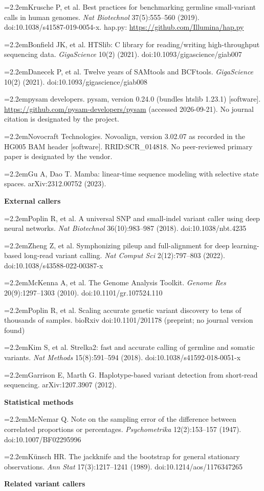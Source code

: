 \documentclass[11pt,a4paper]{article}
\newcommand{\refitem}[2]{\par\noindent\hangindent=2.2em\hangafter=1\makebox[2.2em][l]{[#1]}#2\par\vspace{2pt}}
\begin{document}
\refitem{11}{Krusche P, et al. Best practices for benchmarking germline small-variant calls in human genomes. \emph{Nat Biotechnol} 37(5):555--560 (2019). doi:10.\allowbreak{}1038/\allowbreak{}s41587-019-0054-x.\allowbreak{} hap.py: \url{https://github.com/Illumina/hap.py}}
\refitem{12}{Bonfield JK, et al. HTSlib: C library for reading/writing high-throughput sequencing data. \emph{GigaScience} 10(2) (2021). doi:10.\allowbreak{}1093/\allowbreak{}gigascience/\allowbreak{}giab007}
\refitem{13}{Danecek P, et al. Twelve years of SAMtools and BCFtools. \emph{GigaScience} 10(2) (2021). doi:10.\allowbreak{}1093/\allowbreak{}gigascience/\allowbreak{}giab008}
\refitem{14}{pysam developers. pysam, version 0.24.0 (bundles htslib 1.23.1) [software]. \url{https://github.com/pysam-developers/pysam} (accessed 2026-09-21). No journal citation is designated by the project.}
\refitem{15}{Novocraft Technologies. Novoalign, version 3.02.07 as recorded in the HG005 BAM header [software]. RRID:SCR\_014818. No peer-reviewed primary paper is designated by the vendor.}
\refitem{16}{Gu A, Dao T. Mamba: linear-time sequence modeling with selective state spaces. arXiv:2312.00752 (2023).}
\textbf{External callers}

\refitem{17}{Poplin R, et al. A universal SNP and small-indel variant caller using deep neural networks. \emph{Nat Biotechnol} 36(10):983--987 (2018). doi:10.\allowbreak{}1038/\allowbreak{}nbt.\allowbreak{}4235}
\refitem{18}{Zheng Z, et al. Symphonizing pileup and full-alignment for deep learning-based long-read variant calling. \emph{Nat Comput Sci} 2(12):797--803 (2022). doi:10.\allowbreak{}1038/\allowbreak{}s43588-022-00387-x}
\refitem{19}{McKenna A, et al. The Genome Analysis Toolkit. \emph{Genome Res} 20(9):1297--1303 (2010). doi:10.\allowbreak{}1101/\allowbreak{}gr.\allowbreak{}107524.\allowbreak{}110}
\refitem{20}{Poplin R, et al. Scaling accurate genetic variant discovery to tens of thousands of samples. bioRxiv doi:10.\allowbreak{}1101/\allowbreak{}201178 (preprint; no journal version found)}
\refitem{21}{Kim S, et al. Strelka2: fast and accurate calling of germline and somatic variants. \emph{Nat Methods} 15(8):591--594 (2018). doi:10.\allowbreak{}1038/\allowbreak{}s41592-018-0051-x}
\refitem{22}{Garrison E, Marth G. Haplotype-based variant detection from short-read sequencing. arXiv:1207.3907 (2012).}
\textbf{Statistical methods}

\refitem{23}{McNemar Q. Note on the sampling error of the difference between correlated proportions or percentages. \emph{Psychometrika} 12(2):153--157 (1947). doi:10.\allowbreak{}1007/\allowbreak{}BF02295996}
\refitem{24}{K\"unsch HR. The jackknife and the bootstrap for general stationary observations. \emph{Ann Stat} 17(3):1217--1241 (1989). doi:10.\allowbreak{}1214/\allowbreak{}aos/\allowbreak{}1176347265}
\textbf{Related variant callers}
\end{document}
